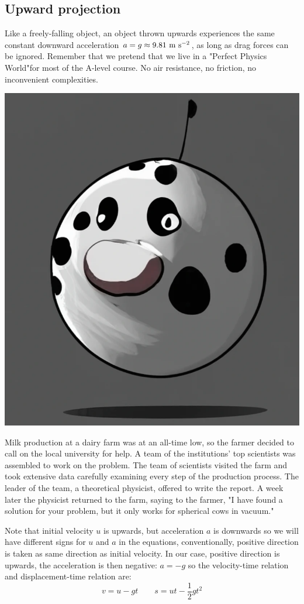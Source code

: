 \subsection{Upward projection}

Like a freely-falling object, an object thrown upwards experiences the same constant downward acceleration $a=g\approx9.81\text{ m s$^{-2}$}$, as long as drag forces can be ignored. Remember that we pretend that we live in a "Perfect Physics World"\texttrademark for most of the A-level course. No air resistance, no friction, no inconvenient complexities. \begin{marginfigure}
        \centering
        \includegraphics[width=0.5\linewidth]{sphericalcow.png}
        \caption{Milk production at a dairy farm was at an all-time low, so the farmer decided to call on the local university for help. A team of the institutions' top scientists was assembled to work on the problem. The team of scientists visited the farm and took extensive data carefully examining every step of the production process. The leader of the team, a theoretical physicist, offered to write the report. A week later the physicist returned to the farm, saying to the farmer, "I have found a solution for your problem, but it only works for spherical cows in vacuum."}
        \label{fig:enter-label}
\end{marginfigure}

Note that initial velocity $u$ is upwards, but acceleration $a$ is downwards
so we will have different signs for $u$ and $a$ in the equations, conventionally, positive direction is taken as same direction as initial velocity. In our case, positive direction is upwards, the acceleration is then negative: $a=-g$ so the velocity-time relation and displacement-time relation are:
\begin{equation*}
v = u - gt \quad \quad s = ut - \frac{1}{2}gt^2
\end{equation*}

